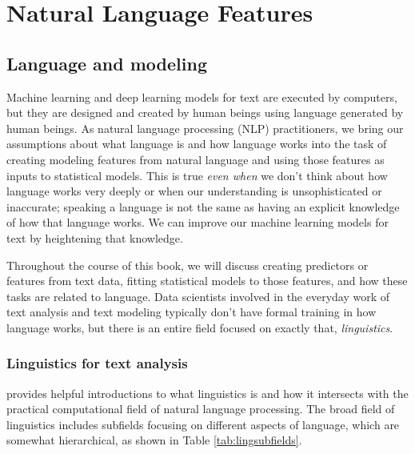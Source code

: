 \documentclass[
]{krantz}
\begin{document}
\hypertarget{part-natural-language-features}{%
\part{Natural Language Features}\label{part-natural-language-features}}

\hypertarget{language}{%
\chapter{Language and modeling}\label{language}}

Machine learning and deep learning models for text are executed by computers, but they are designed and created by human beings using language generated by human beings. As natural language processing (NLP) practitioners, we bring our assumptions about what language is and how language works into the task of creating modeling features from natural language and using those features as inputs to statistical models. This is true \emph{even when} we don't think about how language works very deeply or when our understanding is unsophisticated or inaccurate; speaking a language is not the same as having an explicit knowledge of how that language works. We can improve our machine learning models for text by heightening that knowledge.

Throughout the course of this book, we will discuss creating predictors or features from text data, fitting statistical models to those features, and how these tasks are related to language. Data scientists involved in the everyday work of text analysis and text modeling typically don't have formal training in how language works, but there is an entire field focused on exactly that, \emph{linguistics}.

\hypertarget{linguistics-for-text-analysis}{%
\section{Linguistics for text analysis}\label{linguistics-for-text-analysis}}

\citet{Briscoe13} provides helpful introductions to what linguistics is and how it intersects with the practical computational field of natural language processing. The broad field of linguistics includes subfields focusing on different aspects of language, which are somewhat hierarchical, as shown in Table \ref{tab:lingsubfields}.

\end{document}
